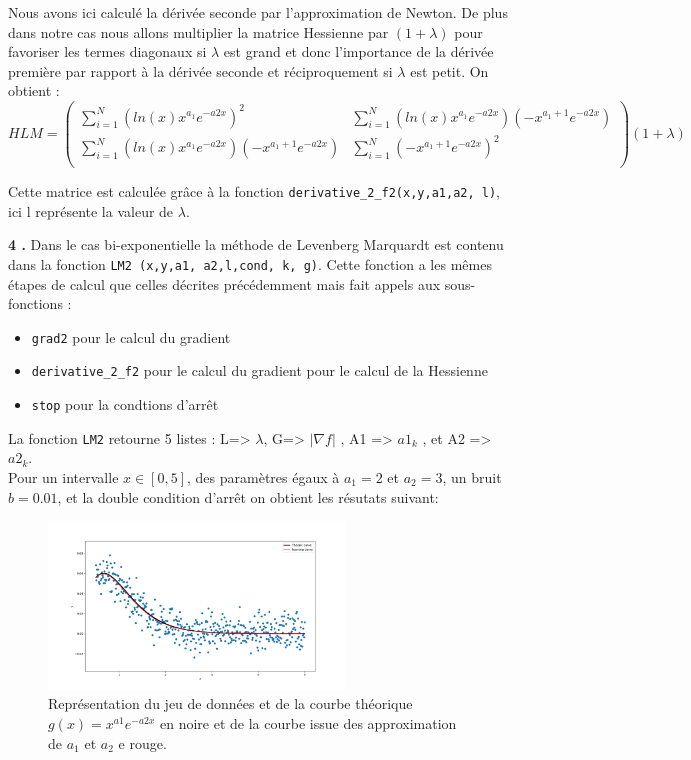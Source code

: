 \documentclass[12pt]{article}
\begin{document}
Nous avons ici calculé la dérivée seconde par l'approximation de Newton. De plus dans notre cas nous allons multiplier la matrice Hessienne par $(1 + \lambda)$ pour favoriser les termes diagonaux si $\lambda$ est grand et donc l'importance de la dérivée première par rapport à la dérivée seconde et réciproquement si $\lambda$ est petit. On obtient :
$$HLM = 
\begin{pmatrix} 
\sum_{i=1}^N (ln(x) x^{a_1} e^{-a2x})^2 & \sum_{i=1}^N (ln(x) x^{a_1} e^{-a2x})(-x^{a_1+1}e^{-a2x})  \\
 \sum_{i=1}^N (ln(x) x^{a_1} e^{-a2x})(-x^{a_1+1}e^{-a2x}) & \sum_{i=1}^N (-x^{a_1+1}e^{-a2x})^2 \\
\end{pmatrix} (1 +\lambda)
$$
 
 Cette matrice est calculée grâce à la fonction \verb|derivative_2_f2(x,y,a1,a2, l)|, ici l représente la valeur de $\lambda$.
 
 \textbf{\color{brick}4 .}
Dans le cas bi-exponentielle la méthode de Levenberg Marquardt est contenu dans la fonction \verb|LM2 (x,y,a1, a2,l,cond, k, g)|. Cette fonction a les mêmes étapes de calcul que celles décrites précédemment mais fait appels aux sous-fonctions :
\begin{itemize}
    \item \verb|grad2| pour le calcul du gradient 
    \item \verb|derivative_2_f2| pour le calcul du gradient pour le calcul de la Hessienne
    \item \verb|stop| pour la condtions d'arrêt
\end{itemize}
La fonction \verb|LM2| retourne 5 listes : L=> $\lambda$, G=> $|\nabla f|$ , A1 => $a1_k$ , et A2 => $a2_k$.\\
Pour un intervalle $x\in [0,5]$, des paramètres égaux à $a_1 = 2 $ et  $a_2 = 3 $,  un bruit $b =0.01$, et la double condition d'arrêt on obtient les résutats suivant:
 
  
 \begin{figure}[H]
\centering
\includegraphics[width=0.7\textwidth]{Q15.png}
\caption{Représentation du jeu de données et de la courbe théorique $g(x)= x^{a1}e^{-a2x}$ en noire et de la courbe issue des approximation de $a_1$ et $a_2$ e rouge.}
\label{FigQ12}
\end{figure}
 
\end{document}
